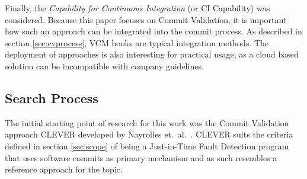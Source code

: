 Finally, the \textit{Capability for Continuous Integration} (or CI Capability) was considered. Because this paper focuses on Commit Validation, it is important how such an approach can be integrated into the commit process. As described in section \ref{sec:cvprocess}, VCM hooks are typical integration methods. The deployment of approaches is also interesting for practical usage, as a cloud based solution can be incompatible with company guidelines.


\subsection{Search Process}
\label{sec:searchprocess}

The initial starting point of research for this work was the Commit Validation approach CLEVER developed by Nayrolles et.~al.~\cite{Nayrolles2018}. CLEVER suits the criteria defined in section \ref{sec:scope} of being a Just-in-Time Fault Detection program that uses software commits as primary mechanism and as such resembles a reference approach for the topic.  

